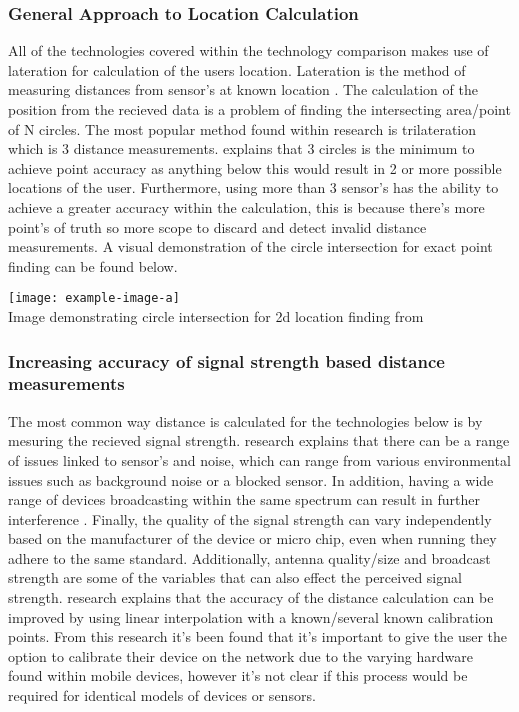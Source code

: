 \subsubsection{General Approach to Location Calculation}
All of the technologies covered within the technology comparison makes use of lateration for calculation of the users location. Lateration is the method of measuring distances from sensor's at known location \citetemp. The calculation of the position from the recieved data is a problem of finding the intersecting area/point of N circles. The most popular method found within research is trilateration which is 3 distance measurements. \citetemp explains that 3 circles is the minimum to achieve point accuracy as anything below this would result in 2 or more possible locations of the user. Furthermore, using more than 3 sensor's has the ability to achieve a greater accuracy within the calculation, this is because there's more point's of truth so more scope to discard and detect invalid distance measurements. A visual demonstration of the circle intersection for exact point finding can be found below.

\begin{center}
	\texttt{[image: example-image-a]}\\
	Image demonstrating circle intersection for 2d location finding from \citetemp
\end{center}

\subsubsection{Increasing accuracy of signal strength based distance measurements}
The most common way distance is calculated for the technologies below is by mesuring the recieved signal strength. \citetemp research explains that there can be a range of issues linked to sensor's and noise, which can range from various environmental issues such as background noise or a blocked sensor. In addition, having a wide range of devices broadcasting within the same spectrum can result in further interference \citetemp. Finally, the quality of the  signal strength can vary independently based on the manufacturer of the device or micro chip, even when running they adhere to the same standard. Additionally, antenna quality/size and broadcast strength are some of the variables that can also effect the perceived signal strength. \citetemp research explains that the accuracy of the distance calculation can be improved by using linear interpolation with a known/several known calibration points. From this research it's been found that it's important to give the user the option to calibrate their device on the network due to the varying hardware found within mobile devices, however it's not clear if this process would be required for identical models of devices or sensors.\\


